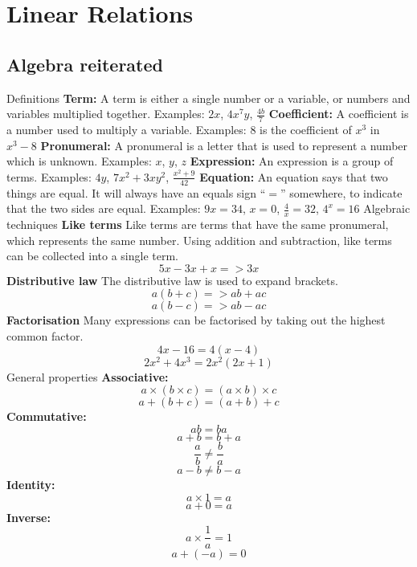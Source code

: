\section{Linear Relations}

\begin{outline}

\0
\subsection{Algebra reiterated}
	\1 Definitions
		\2 \textbf{Term:} A term is either a single number or a variable, or numbers and variables multiplied together. 
			\3 Examples: $2x$, $4x^7 y$, $\frac{4b}{7}$
		\2 \textbf{Coefficient:} A coefficient is a number used to multiply a variable.
			\3 Examples: $8$ is the coefficient of $x^3$ in $x^3 - 8$
		\2 \textbf{Pronumeral:} A pronumeral is a letter that is used to represent a number which is unknown.
			\3 Examples: $x$, $y$, $z$
		\2 \textbf{Expression:} An expression is a group of terms.
			\3 Examples: $4y$, $7x^2 + 3xy^2$, $\frac{x^2+9}{42}$
		\2 \textbf{Equation:} An equation says that two things are equal. It will always have an equals sign ``$=$'' somewhere, to indicate that the two sides are equal.
			\3 Examples: $9x = 34$, $x = 0$, $\frac{4}{x}=32$, $4^x=16$
	\1 Algebraic techniques
		\2 \textbf{Like terms}
			\3 Like terms are terms that have the same pronumeral, which represents the same number. Using addition and subtraction, like terms can be collected into a single term.
				\[5x-3x+x => 3x\]
		\2 \textbf{Distributive law}
			\3 The distributive law is used to expand brackets.
				\[a(b+c) => ab+ac\]
				\[a(b-c) => ab - ac\]
		\2 \textbf{Factorisation}
			\3 Many expressions can be factorised by taking out the highest common factor.
				\[4x-16 = 4(x-4)\]
				\[2x^2 + 4x^3 = 2x^2(2x+ 1)\]
	\1 General properties
		\2 \textbf{Associative:}
			\[a \times (b \times c) = (a \times b) \times c\]
			\[a + (b + c) = (a + b) + c\]
		\2 \textbf{Commutative:}
			\[ab = ba\]
			\[a + b = b + a\]
			\[\frac{a}{b}\ne\frac{b}{a}\]
			\[a - b \ne b - a\]
		\2 \textbf{Identity:}
			\[a \times 1 = a\]
			\[a + 0 = a\]
		\2 \textbf{Inverse:}
			\[a \times \frac{1}{a} = 1\]
			\[a + (-a) = 0\]

\0

\end{outline}
